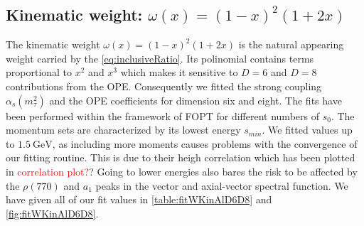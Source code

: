 \documentclass[../../index.tex]{subfiles}
\begin{document}
\subsection{Kinematic weight: $\omega(x) = (1-x)^2(1+2x)$}
The kinematic weight $\omega(x) = (1-x)^2(1+2x)$ is the natural appearing weight
carried by the \cref{eq:inclusiveRatio}. Its polinomial contains terms
proportional to $x^2$ and $x^3$ which makes it sensitive to $D=6$ and $D=8$
contributions from the OPE. Consequently we  fitted the strong coupling
$\alpha_s(m_\tau^2)$ and the OPE coefficients for dimension six and eight.
The fits have been performed within the framework of FOPT for different numbers
of $s_0$. The momentum sets are characterized by its lowest energy $s_{min}$. We
fitted values up to $\SI{1.5}{\giga\eV}$, as including more moments causes
problems with the convergence of our fitting routine. This is due to their heigh
correlation which has been plotted in \textcolor{red}{correlation plot?}? Going
to lower energies also bares the risk to be affected by the $\rho(770)$ and
$a_1$ peaks in the vector and axial-vector spectral function. We have given all
of our fit values in \cref{table:fitWKinAlD6D8} and \cref{fig:fitWKinAlD6D8}.
\end{document}
